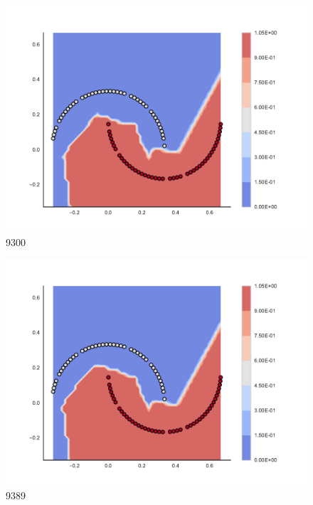 \begin{subfigure}[b]{0.09\textwidth}
    \includegraphics[clip, trim=2.35cm 1.75cm 4.5cm 0cm,width=\textwidth]{img/convergence/9300.pdf}
    \caption{9300}
    \label{fig:convergence_9300}
\end{subfigure}
%
\begin{subfigure}[b]{0.09\textwidth}
    \includegraphics[clip, trim=2.35cm 1.75cm 4.5cm 0cm,width=\textwidth]{img/convergence/9389.pdf}
    \caption{9389}
    \label{fig:convergence_9389}
\end{subfigure}
%
